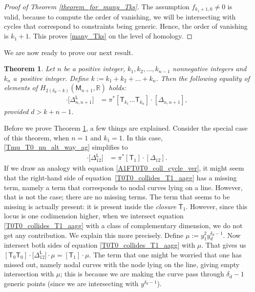 \documentclass[11pt]{article}
\numberwithin{equation}{section}
\newtheorem{thm}{Theorem}[section]
\begin{document}
\begin{proof}[Proof of Theorem \ref{theorem_for_many_Tks}]
The assumption $f_{k_1+1, 0} \neq 0$ is valid, because
to compute the order of vanishing, we will be intersecting with
cycles that correspond to constraints being generic. Hence, the order of vanishing is $k_1+1$.
This proves \eqref{many_Tks} on the level of homology.
\end{proof}

We are now ready to prove our next result.

\begin{thm}
\label{Tk1Tk2_etc_alt_way}
Let $n$ be a positive integer, $k_1, k_2,\dots, k_{n-1}$ nonnegative integers
and $k_n$ a~positive integer.
Define
$
k :=  k_1+k_2+\dots +k_n$.
Then the following equality of elements of $H_{2(\delta_d-k)}(\mathsf{M}_{n+1}, {\mathbb R})$ holds:
\begin{align}
[\mathsf{T}_{k_1} \dots \mathsf{T}_{k_{n-1}} \mathsf{T}_{k_n-1} \mathsf{T}_0] \cdot \bigl[\Delta_{n, {n+1}}^{\mathsf{L}}\bigr] & =
\pi^*[\mathsf{T}_{k_1} \dots \mathsf{T}_{k_n}] \cdot [\Delta_{n, n+1}],
\label{Tmu_T0_nu_alt_way_ag}
\end{align}
provided $d > k+n-1$.
\end{thm}

Before we prove Theorem \ref{Tk1Tk2_etc_alt_way}, a few things are explained.
Consider the special case of this theorem, when $n = 1$ and $k_1 = 1$.
In this case, \eqref{Tmu_T0_nu_alt_way_ag} simplifies to
\begin{align}
[\mathsf{T}_0 \mathsf{T}_0] \cdot \bigl[\Delta^{\mathsf{L}}_{12}\bigr] &  =  \pi^*[\mathsf{T}_1]\cdot [\Delta_{12}].
\label{T0T0_collides_T1_aagg}
\end{align}
If we draw an analogy with equation \eqref{A1FT0T0_coll_cycle_ver},
it might seem that the right-hand side
of equation~\eqref{T0T0_collides_T1_aagg}
has a missing term, namely
a term that corresponds to nodal curves lying
on a line. However, that is not the case; there are no missing terms.
The term that seems to be missing is actually present: it is present
inside the \emph{closure} $\overline{\mathsf{T}}_1$. However, since this locus
is one codimension higher, when we intersect
equation \eqref{T0T0_collides_T1_aagg} with a class of complementary dimension, we do not get
any contribution. We explain this more precisely. Define
$\mu := y_1^{2} y_d^{\delta_d-1}$. Now intersect both sides of
equation \eqref{T0T0_collides_T1_aagg} with $\mu$. That gives us
$[\mathsf{T}_0 \mathsf{T}_0] \cdot \bigl[\Delta^{\mathsf{L}}_{12}\bigr]\cdot \mu  =
[\mathsf{T}_1]\cdot \mu$.
The term that one might be worried that one has missed out, namely nodal curves
with the node lying on the line, giving empty intersection with $\mu$; this is
because we are making the curve pass through $\delta_d-1$ generic points \big(since we
are intersecting with $y^{\delta_d-1}$\big).
\end{document}
